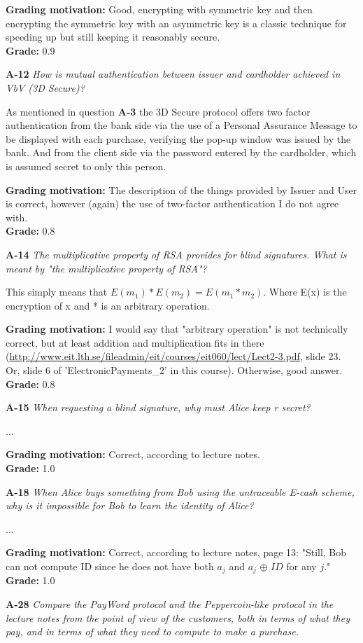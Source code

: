 \documentclass[a4paper]{article}
\newcommand{\Q}[2]{
  \vspace{10pt} \textbf{#1} \textit{#2}
 }
\newcommand{\A}[1]{ #1 }
\newcommand{\Grade}[2]{ 
  \textbf{Grading motivation:} #2 \\ 
  \hspace*{\fill} \textbf{Grade:} #1 
}
\begin{document}
\Grade{0.9}{
  Good, encrypting with symmetric key and then encrypting the symmetric
  key with an asymmetric key is a classic technique for speeding up
  but still keeping it reasonably secure.
}

\Q{A-12} {How is mutual authentication between issuer and cardholder achieved
in VbV (3D Secure)?}

\A{
  As mentioned in question \textbf{A-3} the 3D Secure protocol offers two factor authentication from the bank side via the use of a Personal Assurance Message
  to be displayed with each purchase, verifying the pop-up window was issued by
  the bank. And from the client side via the password entered by the cardholder,
  which is assumed secret to only this person.
}

\Grade{0.8}{
  The description of the things provided by Issuer and User is correct,
  however (again) the use of two-factor authentication I do not agree with.
}

\Q{A-14} {The multiplicative property of RSA provides for blind signatures. What
is meant by "the multiplicative property of RSA"?}

\A{
  This simply means that $E(m_1) * E(m_2) = E(m_1 * m_2)$. Where E(x) is the
  encryption of x and * is an arbitrary operation.
}

\Grade{0.8}{
  I would say that "arbitrary operation" is not technically correct, but
  at least addition and multiplication fits in there (\url{http://www.eit.lth.se/fileadmin/eit/courses/eit060/lect/Lect2-3.pdf}, slide 23. Or, slide 6 of 'ElectronicPayments\_2' in this course). Otherwise,
  good answer.
}

\Q{A-15}{When requesting a blind signature, why must Alice keep r secret?}

\A{...}

\Grade{1.0}{
  Correct, according to lecture notes.
}

\Q{A-18} {When Alice buys something from Bob using the untraceable E-cash
scheme, why is it impossible for Bob to learn the identity of Alice?}

\A{
  ...
}

\Grade{1.0}{
  Correct, according to lecture notes, page 13: "Still, Bob can not 
  compute ID since he does not have both $a_j$ and $a_j$ $\oplus$ $ID$
  for any $j$."
}

\Q{A-28} {Compare the PayWord protocol and the Peppercoin-like protocol in the
lecture notes from the point of view of the customers, both in terms of what they
pay, and in terms of what they need to compute to make a purchase.}
\end{document}
